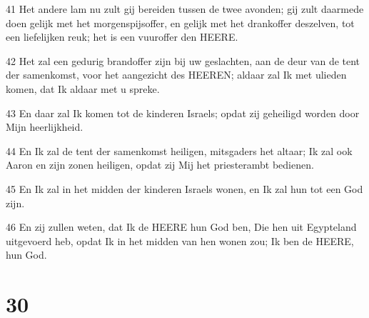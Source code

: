 \par 41 Het andere lam nu zult gij bereiden tussen de twee avonden; gij zult daarmede doen gelijk met het morgenspijsoffer, en gelijk met het drankoffer deszelven, tot een liefelijken reuk; het is een vuuroffer den HEERE.
\par 42 Het zal een gedurig brandoffer zijn bij uw geslachten, aan de deur van de tent der samenkomst, voor het aangezicht des HEEREN; aldaar zal Ik met ulieden komen, dat Ik aldaar met u spreke.
\par 43 En daar zal Ik komen tot de kinderen Israels; opdat zij geheiligd worden door Mijn heerlijkheid.
\par 44 En Ik zal de tent der samenkomst heiligen, mitsgaders het altaar; Ik zal ook Aaron en zijn zonen heiligen, opdat zij Mij het priesterambt bedienen.
\par 45 En Ik zal in het midden der kinderen Israels wonen, en Ik zal hun tot een God zijn.
\par 46 En zij zullen weten, dat Ik de HEERE hun God ben, Die hen uit Egypteland uitgevoerd heb, opdat Ik in het midden van hen wonen zou; Ik ben de HEERE, hun God.

\chapter{30}

